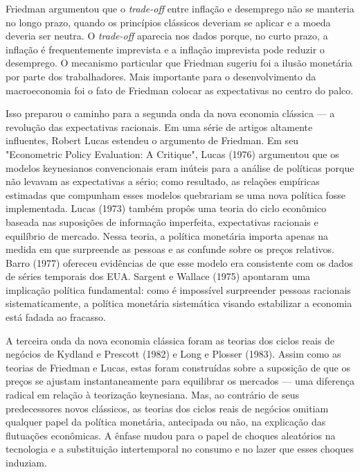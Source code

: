\documentclass[12pt]{article}
\begin{document}
Friedman argumentou que o \textit{trade-off} entre inflação e desemprego não se manteria no longo prazo, quando os princípios clássicos deveriam se aplicar e a moeda deveria ser neutra. O \textit{trade-off} aparecia nos dados porque, no curto prazo, a inflação é frequentemente imprevista e a inflação imprevista pode reduzir o desemprego. O mecanismo particular que Friedman sugeriu foi a ilusão monetária por parte dos trabalhadores. Mais importante para o desenvolvimento da macroeconomia foi o fato de Friedman colocar as expectativas no centro do palco.

Isso preparou o caminho para a segunda onda da nova economia clássica — a revolução das expectativas racionais. Em uma série de artigos altamente influentes, Robert Lucas estendeu o argumento de Friedman. Em seu "Econometric Policy Evaluation: A Critique", Lucas (1976) argumentou que os modelos keynesianos convencionais eram inúteis para a análise de políticas porque não levavam as expectativas a sério; como resultado, as relações empíricas estimadas que compunham esses modelos quebrariam se uma nova política fosse implementada. Lucas (1973) também propôs uma teoria do ciclo econômico baseada nas suposições de informação imperfeita, expectativas racionais e equilíbrio de mercado. Nessa teoria, a política monetária importa apenas na medida em que surpreende as pessoas e as confunde sobre os preços relativos. Barro (1977) ofereceu evidências de que esse modelo era consistente com os dados de séries temporais dos EUA. Sargent e Wallace (1975) apontaram uma implicação política fundamental: como é impossível surpreender pessoas racionais sistematicamente, a política monetária sistemática visando estabilizar a economia está fadada ao fracasso.

A terceira onda da nova economia clássica foram as teorias dos ciclos reais de negócios de Kydland e Prescott (1982) e Long e Plosser (1983). Assim como as teorias de Friedman e Lucas, estas foram construídas sobre a suposição de que os preços se ajustam instantaneamente para equilibrar os mercados — uma diferença radical em relação à teorização keynesiana. Mas, ao contrário de seus predecessores novos clássicos, as teorias dos ciclos reais de negócios omitiam qualquer papel da política monetária, antecipada ou não, na explicação das flutuações econômicas. A ênfase mudou para o papel de choques aleatórios na tecnologia e a substituição intertemporal no consumo e no lazer que esses choques induziam.
\end{document}
